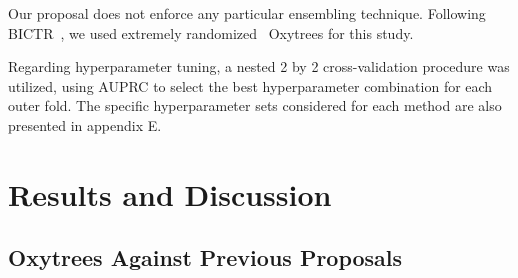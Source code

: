 \documentclass[letterpaper]{article}
\begin{document}
Our proposal does not enforce any particular ensembling technique.
Following BICTR~\cite{pliakos_drug-target_2020}, we used extremely randomized~\cite{geurts_extremely_2006} Oxytrees for this study. 

Regarding hyperparameter tuning, a nested 2 by 2 cross-validation procedure was utilized, using AUPRC to select the best hyperparameter combination for each outer fold.
The specific hyperparameter sets considered for each method are also presented in
appendix E.


\section{Results and Discussion}
\label{sec:results}

\subsection{Oxytrees Against Previous Proposals}
\label{sec:literature comparison}
\end{document}
